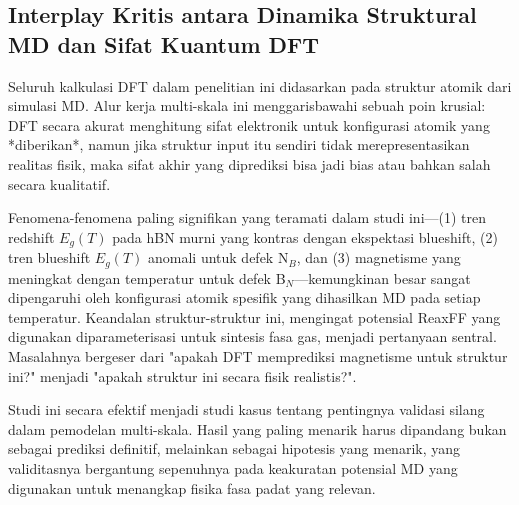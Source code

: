 \subsection{Interplay Kritis antara Dinamika Struktural MD dan Sifat Kuantum DFT}
\label{subsec:korelasi_struktur_md_dft}
Seluruh kalkulasi DFT dalam penelitian ini didasarkan pada struktur atomik dari simulasi MD. Alur kerja multi-skala ini menggarisbawahi sebuah poin krusial: DFT secara akurat menghitung sifat elektronik untuk konfigurasi atomik yang *diberikan*, namun jika struktur input itu sendiri tidak merepresentasikan realitas fisik, maka sifat akhir yang diprediksi bisa jadi bias atau bahkan salah secara kualitatif.

Fenomena-fenomena paling signifikan yang teramati dalam studi ini—(1) tren redshift $E_g(T)$ pada hBN murni yang kontras dengan ekspektasi blueshift, (2) tren blueshift $E_g(T)$ anomali untuk defek N$_B$, dan (3) magnetisme yang meningkat dengan temperatur untuk defek B$_N$—kemungkinan besar sangat dipengaruhi oleh konfigurasi atomik spesifik yang dihasilkan MD pada setiap temperatur. Keandalan struktur-struktur ini, mengingat potensial ReaxFF yang digunakan \citep{Lele2022} diparameterisasi untuk sintesis fasa gas, menjadi pertanyaan sentral. Masalahnya bergeser dari "apakah DFT memprediksi magnetisme untuk struktur ini?" menjadi "apakah struktur ini secara fisik realistis?".

Studi ini secara efektif menjadi studi kasus tentang pentingnya validasi silang dalam pemodelan multi-skala. Hasil yang paling menarik harus dipandang bukan sebagai prediksi definitif, melainkan sebagai hipotesis yang menarik, yang validitasnya bergantung sepenuhnya pada keakuratan potensial MD yang digunakan untuk menangkap fisika fasa padat yang relevan.

